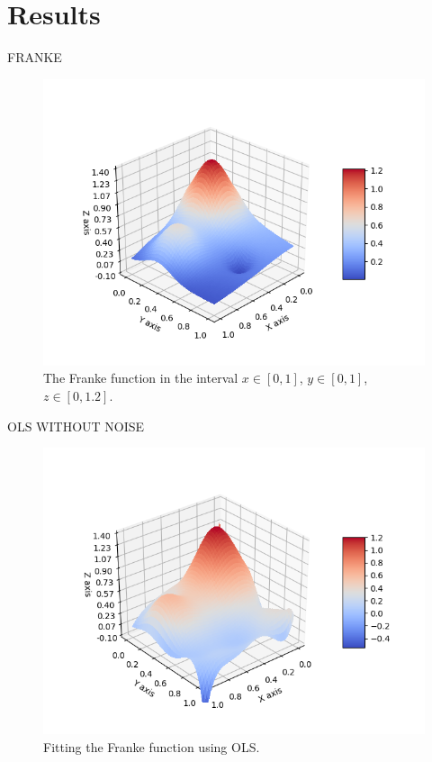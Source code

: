 \section{Results} \label{sec:results}

FRANKE

 \begin{figure} [H]
 	\centering
 	\includegraphics[scale=0.8]{../plots/franke.png}
 	\caption{The Franke function in the interval $x\in[0,1]$, $y\in[0,1]$, $z\in[0, 1.2]$.}
 	\label{fig:franke}
 \end{figure}
 
 
OLS WITHOUT NOISE

 \begin{figure} [H]
 	\centering
 	\includegraphics[scale=0.8]{../plots/OLS.png}
 	\caption{Fitting the Franke function using OLS.}
 	\label{fig:franke}
 \end{figure}